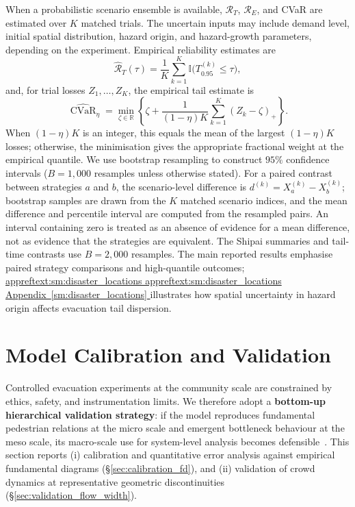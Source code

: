 \documentclass[preprint,12pt]{elsarticle}
\providecommand{\FloatBarrier}{}
\let\origsection\section
\renewcommand{\section}{\FloatBarrier\origsection}
\DeclareRobustCommand{\appref}[1]{%
  \hyperref[#1]{%
    \ifcsname appreftext:#1\endcsname%
      \csname appreftext:#1\endcsname%
    \else%
      Appendix~\ref*{#1}%
    \fi%
  }%
}
\begin{document}
When a
probabilistic scenario ensemble is available, $\mathcal{R}_T$,
$\mathcal{R}_E$, and CVaR are estimated over $K$ matched trials. The
uncertain inputs may include demand level, initial spatial
distribution, hazard origin, and hazard-growth parameters, depending
on the experiment. Empirical reliability estimates are
\begin{equation}
\widehat{\mathcal{R}}_T(\tau)
= \frac{1}{K} \sum_{k=1}^{K}
  \mathbb{I}\!\big(T_{0.95}^{(k)} \le \tau\big),
\label{eq:reliability_mc}
\end{equation}
and, for trial losses $Z_1,\ldots,Z_K$, the empirical tail estimate is
\begin{equation}
\widehat{\operatorname{CVaR}}_\eta
= \min_{\zeta \in \mathbb{R}}
\left\{
\zeta + \frac{1}{(1-\eta)K}
\sum_{k=1}^{K}(Z_k-\zeta)_+
\right\}.
\label{eq:cvar_mc}
\end{equation}
When $(1-\eta)K$ is an integer, this equals the mean of the largest
$(1-\eta)K$ losses; otherwise, the minimisation gives the appropriate
fractional weight at the empirical quantile. We use bootstrap resampling
to construct $95\%$ confidence intervals ($B = 1{,}000$ resamples
unless otherwise stated). For a paired contrast between strategies
$a$ and $b$, the scenario-level difference is
$d^{(k)}=X_a^{(k)}-X_b^{(k)}$; bootstrap samples are drawn from the
$K$ matched scenario indices, and the mean difference and percentile
interval are computed from the resampled pairs. An interval containing
zero is treated as an absence of evidence for a mean difference, not as
evidence that the strategies are equivalent. The Shipai summaries and
tail-time contrasts use $B=2{,}000$ resamples. The main reported results
emphasise paired strategy comparisons and high-quantile outcomes;
\appref{sm:disaster_locations} illustrates how spatial
uncertainty in hazard origin affects evacuation tail dispersion.


\FloatBarrier
\section{Model Calibration and Validation}
\label{sec:calibration_validation}

Controlled evacuation experiments at the community scale are constrained
by ethics, safety, and instrumentation limits. We therefore adopt a
\textbf{bottom-up hierarchical validation strategy}: if the model
reproduces fundamental pedestrian relations at the micro scale and
emergent bottleneck behaviour at the meso scale, its macro-scale use
for system-level analysis becomes
defensible~\citep{seyfried2005fundamental,zhang2013empirical}. This
section reports (i) calibration and quantitative error analysis against
empirical fundamental diagrams (\S\ref{sec:calibration_fd}), and
(ii) validation of crowd dynamics at representative geometric
discontinuities (\S\ref{sec:validation_flow_width}).
\end{document}
